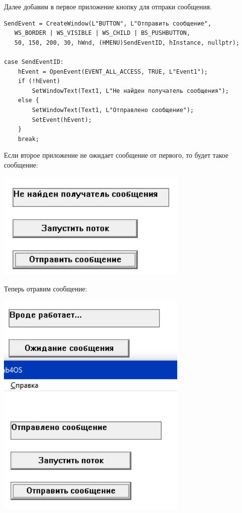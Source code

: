 \documentclass[12pt]{article}
\begin{document}
Далее добавим в первое приложение кнопку для отпраки сообщения.

\begin{verbatim}
SendEvent = CreateWindow(L"BUTTON", L"Отправить сообщение",
   WS_BORDER | WS_VISIBLE | WS_CHILD | BS_PUSHBUTTON, 
   50, 150, 200, 30, hWnd, (HMENU)SendEventID, hInstance, nullptr);

case SendEventID:
    hEvent = OpenEvent(EVENT_ALL_ACCESS, TRUE, L"Event1");
    if (!hEvent)
        SetWindowText(Text1, L"Не найден получатель сообщения");
    else {
        SetWindowText(Text1, L"Отправлено сообщение");
        SetEvent(hEvent);
    }
    break;
\end{verbatim}

Если второе приложение не ожидает сообщение от первого, то будет такое сообщение:\\

\begin{center}
\includegraphics[width=0.7\textwidth]{assets/3.png}\\
\end{center}

Теперь отравим сообщение: \\

\begin{center}
\includegraphics[width=0.7\textwidth]{assets/4.png}\\
\end{center}
\end{document}
